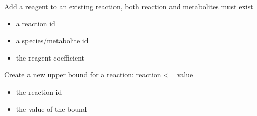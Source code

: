 \documentclass[letterpaper,10pt,english]{sphinxmanual}
\begin{document}
\begin{fulllineitems}

\begin{fulllineitems}
\label{\detokenize{modules_doc:cbmpy.CBModel.Model.createReactionReagent}}
\pysigstartsignatures
{}
\pysigstopsignatures
\sphinxAtStartPar
Add a reagent to an existing reaction, both reaction and metabolites must exist
\begin{itemize}
\item {} 
\sphinxAtStartPar
{} a reaction id

\item {} 
\sphinxAtStartPar
{} a species/metabolite id

\item {} 
\sphinxAtStartPar
{} the reagent coefficient

\end{itemize}

\end{fulllineitems}


\begin{fulllineitems}
\label{\detokenize{modules_doc:cbmpy.CBModel.Model.createReactionUpperBound}}
\pysigstartsignatures
{}
\pysigstopsignatures
\sphinxAtStartPar
Create a new upper bound for a reaction: reaction \textless{}= value
\begin{itemize}
\item {} 
\sphinxAtStartPar
{} the reaction id

\item {} 
\sphinxAtStartPar
{} the value of the bound

\end{itemize}

\end{fulllineitems}


\end{fulllineitems}
\end{document}
